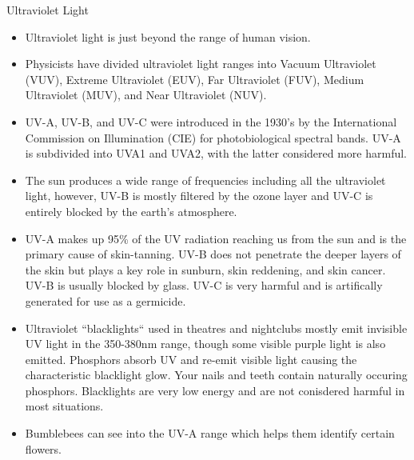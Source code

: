 {\Large Ultraviolet Light}
\begin{itemize}
\item Ultraviolet light is just beyond the range of human vision.

\item Physicists have divided ultraviolet light ranges into Vacuum Ultraviolet (VUV), Extreme Ultraviolet (EUV), Far Ultraviolet (FUV), Medium Ultraviolet (MUV), and Near Ultraviolet (NUV).

\item UV-A, UV-B, and UV-C were introduced in the 1930's by the International Commission on Illumination (CIE) for photobiological spectral bands. UV-A is subdivided into UVA1 and UVA2, with the latter considered more harmful.


\item The sun produces a wide range of frequencies including all the ultraviolet light, however, UV-B is mostly filtered by the ozone layer and UV-C is entirely blocked by the earth's atmosphere.

\item UV-A makes up  95\% of the UV radiation reaching us from the sun and is the primary cause of skin-tanning. UV-B does not penetrate the deeper layers of the skin but plays a key role in sunburn, skin reddening, and skin cancer. UV-B is usually blocked by glass. UV-C is very harmful and is artifically generated for use as a germicide.

\item Ultraviolet ``blacklights`` used in theatres and nightclubs mostly emit invisible UV light in the 350-380nm range, though some visible purple light is also emitted. Phosphors absorb UV and re-emit visible light causing the characteristic blacklight glow. Your nails and teeth contain naturally occuring phosphors. Blacklights are very low energy and are not conisdered harmful in most situations.


\item Bumblebees can see into the UV-A range which helps them identify certain flowers.
\end{itemize}




